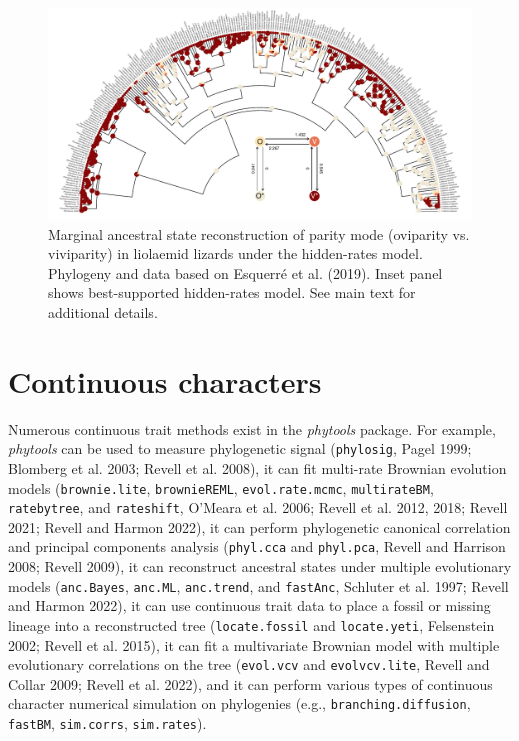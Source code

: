 \documentclass[fleqn,10pt,lineno]{wlpeerj} %
\begin{document}
\begin{figure}
\includegraphics[width=1\linewidth]{Revell.phytools-v2_peerj_files/figure-latex/anc-fitHRM-1} \caption{Marginal ancestral state reconstruction of parity mode (oviparity vs. viviparity) in liolaemid lizards under the hidden-rates model. Phylogeny and data based on Esquerr\'e et al. (2019). Inset panel shows best-supported hidden-rates model. See main text for additional details.}\label{fig:anc-fitHRM}
\end{figure}

\hypertarget{continuous-characters}{%
\section{Continuous characters}\label{continuous-characters}}

Numerous continuous trait methods exist in the \emph{phytools} package. For example, \emph{phytools} can be used to measure phylogenetic signal (\texttt{phylosig}, Pagel 1999; Blomberg et al. 2003; Revell et al. 2008), it can fit multi-rate Brownian evolution models (\texttt{brownie.lite}, \texttt{brownieREML}, \texttt{evol.rate.mcmc}, \texttt{multirateBM}, \texttt{ratebytree}, and \texttt{rateshift}, O'Meara et al. 2006; Revell et al. 2012, 2018; Revell 2021; Revell and Harmon 2022), it can perform phylogenetic canonical correlation and principal components analysis (\texttt{phyl.cca} and \texttt{phyl.pca}, Revell and Harrison 2008; Revell 2009), it can reconstruct ancestral states under multiple evolutionary models (\texttt{anc.Bayes}, \texttt{anc.ML}, \texttt{anc.trend}, and \texttt{fastAnc}, Schluter et al. 1997; Revell and Harmon 2022), it can use continuous trait data to place a fossil or missing lineage into a reconstructed tree (\texttt{locate.fossil} and \texttt{locate.yeti}, Felsenstein 2002; Revell et al. 2015), it can fit a multivariate Brownian model with multiple evolutionary correlations on the tree (\texttt{evol.vcv} and \texttt{evolvcv.lite}, Revell and Collar 2009; Revell et al. 2022), and it can perform various types of continuous character numerical simulation on phylogenies (e.g., \texttt{branching.diffusion}, \texttt{fastBM}, \texttt{sim.corrs}, \texttt{sim.rates}).
\end{document}
